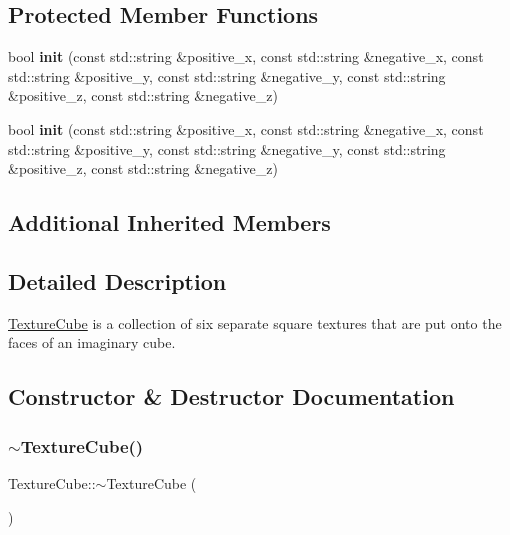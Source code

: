 \subsection*{Protected Member Functions}
\begin{DoxyCompactItemize}
\item 
\mbox{\label{classTextureCube_afa8634c0066cfce51462ff7b4bb47150}} 
bool {\bfseries init} (const std\+::string \&positive\+\_\+x, const std\+::string \&negative\+\_\+x, const std\+::string \&positive\+\_\+y, const std\+::string \&negative\+\_\+y, const std\+::string \&positive\+\_\+z, const std\+::string \&negative\+\_\+z)
\item 
\mbox{\label{classTextureCube_afa8634c0066cfce51462ff7b4bb47150}} 
bool {\bfseries init} (const std\+::string \&positive\+\_\+x, const std\+::string \&negative\+\_\+x, const std\+::string \&positive\+\_\+y, const std\+::string \&negative\+\_\+y, const std\+::string \&positive\+\_\+z, const std\+::string \&negative\+\_\+z)
\end{DoxyCompactItemize}
\subsection*{Additional Inherited Members}


\subsection{Detailed Description}
\hyperlink{classTextureCube}{Texture\+Cube} is a collection of six separate square textures that are put onto the faces of an imaginary cube. 

\subsection{Constructor \& Destructor Documentation}
\mbox{\label{classTextureCube_a37695ecaebde923647c1def15fc3dd99}} 
\subsubsection{\texorpdfstring{$\sim$\+Texture\+Cube()}{~TextureCube()}\hspace{0.1cm}{\footnotesize\ttfamily [1/2]}}
{\footnotesize\ttfamily Texture\+Cube\+::$\sim$\+Texture\+Cube (\begin{DoxyParamCaption}{ }\end{DoxyParamCaption})\hspace{0.3cm}{\ttfamily [virtual]}}

